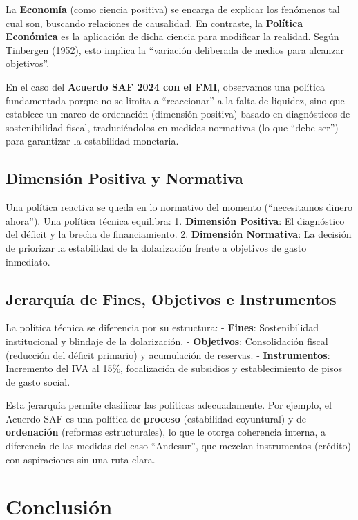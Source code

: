 \documentclass[12pt,spanish]{article}
\begin{document}
La \textbf{Economía} (como ciencia positiva) se encarga de explicar los
fenómenos tal cual son, buscando relaciones de causalidad. En contraste,
la \textbf{Política Económica} es la aplicación de dicha ciencia para
modificar la realidad. Según Tinbergen (1952), esto implica la
``variación deliberada de medios para alcanzar objetivos''.

En el caso del \textbf{Acuerdo SAF 2024 con el FMI}, observamos una
política fundamentada porque no se limita a ``reaccionar'' a la falta de
liquidez, sino que establece un marco de ordenación (dimensión positiva)
basado en diagnósticos de sostenibilidad fiscal, traduciéndolos en
medidas normativas (lo que ``debe ser'') para garantizar la estabilidad
monetaria.

\subsection{Dimensión Positiva y
Normativa}\label{dimensiuxf3n-positiva-y-normativa}

Una política reactiva se queda en lo normativo del momento
(``necesitamos dinero ahora''). Una política técnica equilibra: 1.
\textbf{Dimensión Positiva}: El diagnóstico del déficit y la brecha de
financiamiento. 2. \textbf{Dimensión Normativa}: La decisión de
priorizar la estabilidad de la dolarización frente a objetivos de gasto
inmediato.

\subsection{Jerarquía de Fines, Objetivos e
Instrumentos}\label{jerarquuxeda-de-fines-objetivos-e-instrumentos}

La política técnica se diferencia por su estructura: - \textbf{Fines}:
Sostenibilidad institucional y blindaje de la dolarización. -
\textbf{Objetivos}: Consolidación fiscal (reducción del déficit
primario) y acumulación de reservas. - \textbf{Instrumentos}: Incremento
del IVA al 15\%, focalización de subsidios y establecimiento de pisos de
gasto social.

Esta jerarquía permite clasificar las políticas adecuadamente. Por
ejemplo, el Acuerdo SAF es una política de \textbf{proceso} (estabilidad
coyuntural) y de \textbf{ordenación} (reformas estructurales), lo que le
otorga coherencia interna, a diferencia de las medidas del caso
``Andesur'', que mezclan instrumentos (crédito) con aspiraciones sin una
ruta clara.

\section{Conclusión}\label{conclusiuxf3n}
\end{document}
